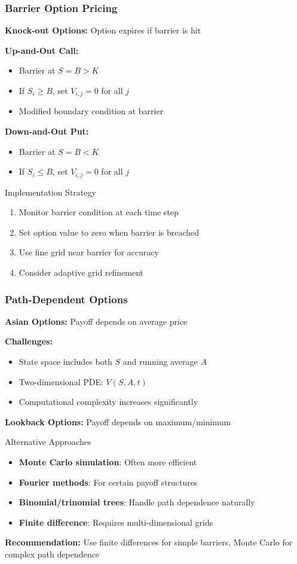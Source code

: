 \documentclass{beamer}
\begin{document}
\begin{frame}
\frametitle{Barrier Option Pricing}
\textbf{Knock-out Options:} Option expires if barrier is hit

\textbf{Up-and-Out Call:}
\begin{itemize}
\item Barrier at \(S = B > K\)
\item If \(S_i \geq B\), set \(V_{i,j} = 0\) for all \(j\)
\item Modified boundary condition at barrier
\end{itemize}

\textbf{Down-and-Out Put:}
\begin{itemize}
\item Barrier at \(S = B < K\)  
\item If \(S_i \leq B\), set \(V_{i,j} = 0\) for all \(j\)
\end{itemize}

\begin{block}{Implementation Strategy}
\begin{enumerate}
\item Monitor barrier condition at each time step
\item Set option value to zero when barrier is breached
\item Use fine grid near barrier for accuracy
\item Consider adaptive grid refinement
\end{enumerate}
\end{block}
\end{frame}

\begin{frame}
\frametitle{Path-Dependent Options}
\textbf{Asian Options:} Payoff depends on average price

\textbf{Challenges:}
\begin{itemize}
\item State space includes both \(S\) and running average \(A\)
\item Two-dimensional PDE: \(V(S, A, t)\)
\item Computational complexity increases significantly
\end{itemize}

\textbf{Lookback Options:} Payoff depends on maximum/minimum

\begin{block}{Alternative Approaches}
\begin{itemize}
\item \textbf{Monte Carlo simulation}: Often more efficient
\item \textbf{Fourier methods}: For certain payoff structures  
\item \textbf{Binomial/trinomial trees}: Handle path dependence naturally
\item \textbf{Finite difference}: Requires multi-dimensional grids
\end{itemize}
\end{block}

\textbf{Recommendation:} Use finite differences for simple barriers, Monte Carlo for complex path dependence
\end{frame}
\end{document}
